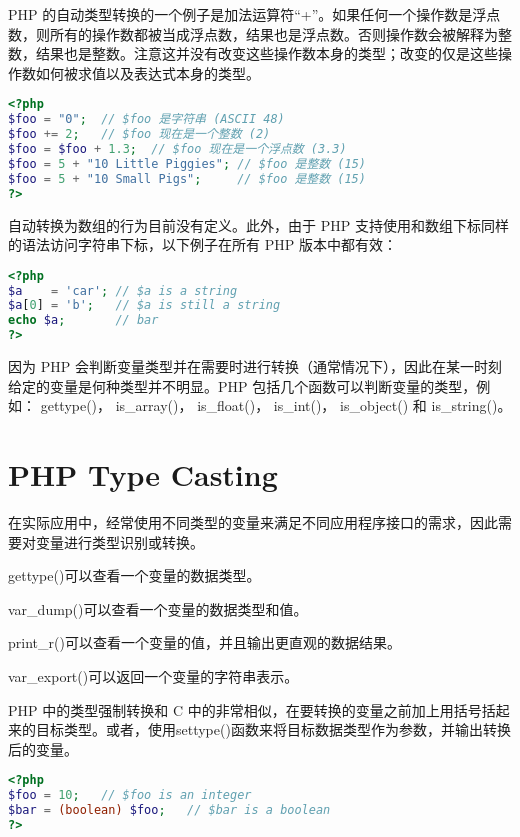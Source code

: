 PHP 的自动类型转换的一个例子是加法运算符“+”。如果任何一个操作数是浮点数，则所有的操作数都被当成浮点数，结果也是浮点数。否则操作数会被解释为整数，结果也是整数。注意这并没有改变这些操作数本身的类型；改变的仅是这些操作数如何被求值以及表达式本身的类型。




\begin{lstlisting}[language=PHP]
<?php
$foo = "0";  // $foo 是字符串 (ASCII 48)
$foo += 2;   // $foo 现在是一个整数 (2)
$foo = $foo + 1.3;  // $foo 现在是一个浮点数 (3.3)
$foo = 5 + "10 Little Piggies"; // $foo 是整数 (15)
$foo = 5 + "10 Small Pigs";     // $foo 是整数 (15)
?>
\end{lstlisting}


自动转换为数组的行为目前没有定义。此外，由于 PHP 支持使用和数组下标同样的语法访问字符串下标，以下例子在所有 PHP 版本中都有效：

\begin{lstlisting}[language=PHP]
<?php
$a    = 'car'; // $a is a string
$a[0] = 'b';   // $a is still a string
echo $a;       // bar
?>
\end{lstlisting}

因为 PHP 会判断变量类型并在需要时进行转换（通常情况下），因此在某一时刻给定的变量是何种类型并不明显。PHP 包括几个函数可以判断变量的类型，例如： gettype()， is\_array()， is\_float()， is\_int()， is\_object() 和 is\_string()。

\section{PHP Type Casting}

在实际应用中，经常使用不同类型的变量来满足不同应用程序接口的需求，因此需要对变量进行类型识别或转换。

\begin{compactitem}
\item gettype()可以查看一个变量的数据类型。
\item var\_dump()可以查看一个变量的数据类型和值。
\item print\_r()可以查看一个变量的值，并且输出更直观的数据结果。
\item var\_export()可以返回一个变量的字符串表示。
\end{compactitem}

PHP 中的类型强制转换和 C 中的非常相似，在要转换的变量之前加上用括号括起来的目标类型。或者，使用settype()函数来将目标数据类型作为参数，并输出转换后的变量。


\begin{lstlisting}[language=PHP]
<?php
$foo = 10;   // $foo is an integer
$bar = (boolean) $foo;   // $bar is a boolean
?>
\end{lstlisting}


